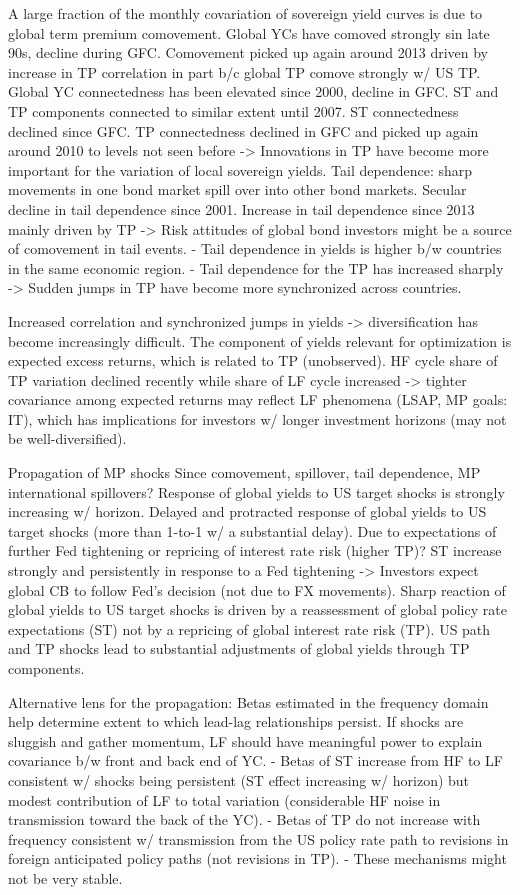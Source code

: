 A large fraction of the monthly covariation of sovereign yield curves is due to global term premium comovement.
Global YCs have comoved strongly sin late 90s, decline during GFC. Comovement picked up again around 2013 driven by increase in TP correlation in part b/c global TP comove strongly w/ US TP.
Global YC connectedness has been elevated since 2000, decline in GFC.
ST and TP components connected to similar extent until 2007. ST connectedness declined since GFC. TP connectedness declined in GFC and picked up again around 2010 to levels not seen before -> Innovations in TP have become more important for the variation of local sovereign yields.
Tail dependence: sharp movements in one bond market spill over into other bond markets.
Secular decline in tail dependence since 2001. Increase in tail dependence since 2013 mainly driven by TP -> Risk attitudes of global bond investors might be a source of comovement in tail events.
- Tail dependence in yields is higher b/w countries in the same economic region.
- Tail dependence for the TP has increased sharply -> Sudden jumps in TP have become more synchronized across countries.

Increased correlation and synchronized jumps in yields -> diversification has become increasingly difficult.
The component of yields relevant for optimization is expected excess returns, which is related to TP (unobserved).
HF cycle share of TP variation declined recently while share of LF cycle increased -> tighter covariance among expected returns may reflect LF phenomena (LSAP, MP goals: IT), which has implications for investors w/ longer investment horizons (may not be well-diversified).

Propagation of MP shocks
Since comovement, spillover, tail dependence, MP international spillovers?
Response of global yields to US target shocks is strongly increasing w/ horizon. Delayed and protracted response of global yields to US target shocks (more than 1-to-1 w/ a substantial delay). 
Due to expectations of further Fed tightening or repricing of interest rate risk (higher TP)? 
ST increase strongly and persistently in response to a Fed tightening -> Investors expect global CB to follow Fed's decision (not due to FX movements).
Sharp reaction of global yields to US target shocks is driven by a reassessment of global policy rate expectations (ST) not by a repricing of global interest rate risk (TP).
US path and TP shocks lead to substantial adjustments of global yields through TP components.

Alternative lens for the propagation: Betas estimated in the frequency domain help determine extent to which lead-lag relationships persist. 
If shocks are sluggish and gather momentum, LF should have meaningful power to explain covariance b/w front and back end of YC.
- Betas of ST increase from HF to LF consistent w/ shocks being persistent (ST effect increasing w/ horizon) but modest contribution of LF to total variation (considerable HF noise in transmission toward the back of the YC).
- Betas of TP do not increase with frequency consistent w/ transmission from the US policy rate path to revisions in foreign anticipated policy paths (not revisions in TP).
- These mechanisms might not be very stable.


